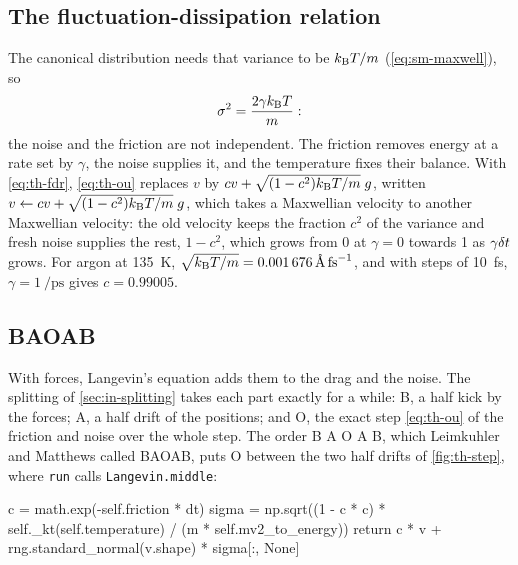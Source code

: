 \subsection*{The fluctuation-dissipation relation}

The canonical distribution needs that variance to be $k_{\mathrm{B}} T/m$
(\cref{eq:sm-maxwell}), so
\begin{equation}
   \sigma^2 = \frac{2\gamma k_{\mathrm{B}} T}{m} :
   \label{eq:th-fdr}
\end{equation}
the noise and the friction are not independent. The friction removes
energy at a rate set by $\gamma$, the noise supplies it, and the
temperature fixes their balance. With \cref{eq:th-fdr}, \cref{eq:th-ou}
replaces $v$ by $cv + \sqrt{(1 - c^2)k_{\mathrm{B}} T/m}\;g$, written $v \leftarrow cv
+ \sqrt{(1 - c^2)k_{\mathrm{B}} T/m}\;g$, which takes a Maxwellian velocity to another
Maxwellian velocity: the old velocity keeps the fraction $c^2$ of the
variance and fresh noise supplies the rest, $1 - c^2$, which grows from 0
at $\gamma = 0$ towards 1 as $\gamma\delta t$ grows. For argon at
\SI{135}{\kelvin}, $\sqrt{\kB T/m} = \SI{0.001676}{\angstrom\per\femto
\second}$, and with steps of \SI{10}{\femto\second}, $\gamma =
\SI{1}{\per\pico\second}$ gives $c = 0.99005$.

\subsection*{BAOAB}

With forces, Langevin's equation adds them to the drag and the noise. The
splitting of \cref{sec:in-splitting} takes each part exactly for a
while: B, a half kick by the forces; A, a half drift of the positions;
and O, the exact step \cref{eq:th-ou} of the friction and noise over the
whole step. The order B A O A B, which Leimkuhler and Matthews called
BAOAB\cite{Leimkuhler2013}, puts O between the two half drifts of
\cref{fig:th-step}, where \texttt{run} calls \texttt{Langevin.middle}:

\begin{code}
    c = math.exp(-self.friction * dt)
    sigma = np.sqrt((1 - c * c) * self._kt(self.temperature)
                    / (m * self.mv2_to_energy))
    return c * v + rng.standard_normal(v.shape) * sigma[:, None]
\end{code}

